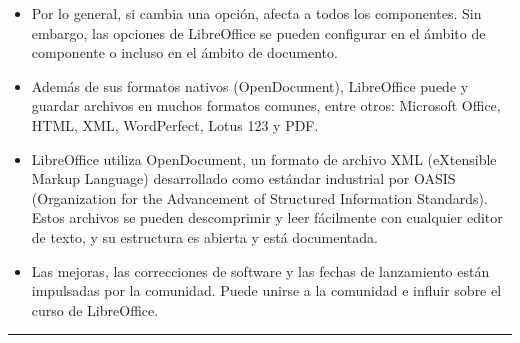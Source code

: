 \documentclass[letterpaper,10pt,spanish]{sphinxmanual}
\begin{document}
\begin{itemize}
\begin{itemize}
\end{itemize}

\item {} 
\sphinxAtStartPar
{} Por lo general, si cambia una opción, afecta a todos los componentes. Sin embargo, las opciones de LibreOffice se pueden configurar en el ámbito de componente o incluso en el ámbito de documento.

\item {} 
\sphinxAtStartPar
{} Además de sus formatos nativos (OpenDocument), LibreOffice puede y guardar archivos en muchos formatos comunes, entre otros: Microsoft Office, HTML, XML, WordPerfect, Lotus 1\sphinxhyphen{}2\sphinxhyphen{}3 y PDF.

\item {} 
\sphinxAtStartPar
{} LibreOffice utiliza OpenDocument, un formato de archivo XML (eXtensible Markup Language) desarrollado como estándar industrial por OASIS (Organization for the Advancement of Structured Information Standards). Estos archivos se pueden descomprimir y leer fácilmente con cualquier editor de texto, y su estructura es abierta y está documentada.

\item {} 
\sphinxAtStartPar
{} Las mejoras, las correcciones de software y las fechas de lanzamiento están impulsadas por la comunidad. Puede unirse a la comunidad e influir sobre el curso de LibreOffice.

\end{itemize}


\bigskip\hrule\bigskip
\end{document}
